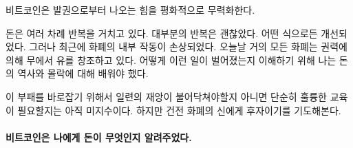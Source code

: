 비트코인은 발권으로부터 나오는 힘을 평화적으로 무력화한다. 




돈은 여러 차례 반복을 거치고 있다. 
대부분의 반복은 괜찮았다. 어떤 식으로든 개선되었다.
그러나 최근에 화폐의 내부 작동이 손상되었다.
오늘날 거의 모든 화폐는 권력에 의해 무에서 유를 창조하고 있다. 
어떻게 이런 일이 벌어졌는지 이해하기 위해 나는 돈의 역사와 몰락에 대해 배워야 했다.



이 부패를 바로잡기 위해서 일련의 재앙이 불어닥쳐야할지 아니면 단순히 훌륭한 교육이 필요할지는 아직 미지수이다. 
하지만 건전 화폐의 신에게 후자이기를 기도해본다.



\paragraph{비트코인은 나에게 돈이 무엇인지 알려주었다.}

%
%
%
%
